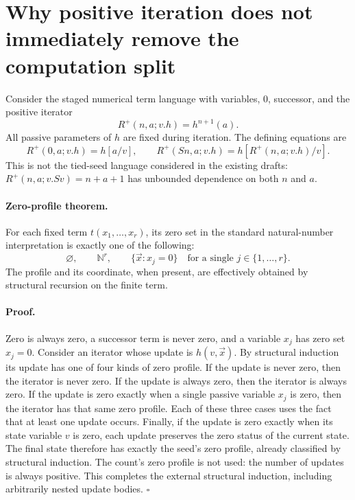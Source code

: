\section{Why positive iteration does not immediately remove the computation split}

Consider the staged numerical term language with variables, $0$, successor,
and the positive iterator
\[
 R^+(n,a;v.h)=h^{n+1}(a).
\]
All passive parameters of $h$ are fixed during iteration.  The defining
equations are
\[
 R^+(0,a;v.h)=h[a/v],\qquad
 R^+(Sn,a;v.h)=h[R^+(n,a;v.h)/v].
\]
This is not the tied-seed language considered in the existing drafts:
$R^+(n,a;v.Sv)=n+a+1$ has unbounded dependence on both $n$ and $a$.

\paragraph{Zero-profile theorem.}
For each fixed term $t(x_1,\ldots,x_r)$, its zero set in the standard
natural-number interpretation is exactly one of the following:
\[
 \varnothing,\qquad \mathbb N^r,\qquad
 \{\vec x:x_j=0\}\quad\text{for a single }j\in\{1,\ldots,r\}.
\]
The profile and its coordinate, when present, are effectively obtained
by structural recursion on the finite term.

\paragraph{Proof.}
Zero is always zero, a successor term is never zero, and a variable $x_j$
has zero set $x_j=0$.  Consider an iterator whose update is $h(v,\vec x)$.
By structural induction its update has one of four kinds of zero profile.
If the update is never zero, then the iterator is never zero.  If the
update is always zero, then the iterator is always zero.  If the update
is zero exactly when a single passive variable $x_j$ is zero, then the
iterator has that same zero profile.  Each of these three cases uses the
fact that at least one update occurs.  Finally, if the update is zero
exactly when its state variable $v$ is zero, each update preserves the
zero status of the current state.  The final state therefore has exactly
the seed's zero profile, already classified by structural induction.
The count's zero profile is not used: the number of updates is always
positive.  This completes the external structural induction, including
arbitrarily nested update bodies. \hfill$\square$

